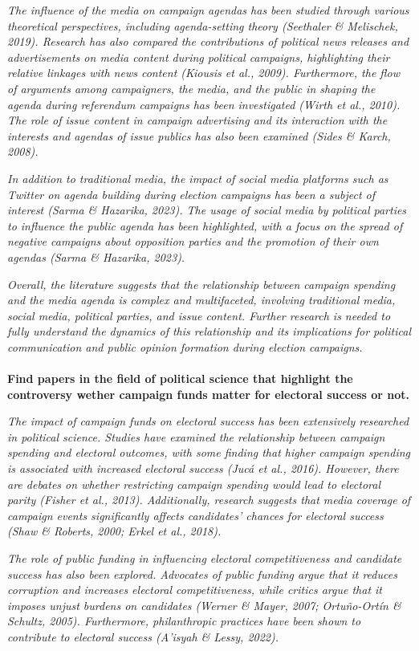 \documentclass[11pt,a4paper]{article}
\begin{document}
 \textit{The influence of the media on campaign agendas has been studied through various theoretical perspectives, including agenda-setting theory (Seethaler \& Melischek, 2019). Research has also compared the contributions of political news releases and advertisements on media content during political campaigns, highlighting their relative linkages with news content (Kiousis et al., 2009). Furthermore, the flow of arguments among campaigners, the media, and the public in shaping the agenda during referendum campaigns has been investigated (Wirth et al., 2010). The role of issue content in campaign advertising and its interaction with the interests and agendas of issue publics has also been examined (Sides \& Karch, 2008).}

 \textit{In addition to traditional media, the impact of social media platforms such as Twitter on agenda building during election campaigns has been a subject of interest (Sarma \& Hazarika, 2023). The usage of social media by political parties to influence the public agenda has been highlighted, with a focus on the spread of negative campaigns about opposition parties and the promotion of their own agendas (Sarma \& Hazarika, 2023).}

 \textit{Overall, the literature suggests that the relationship between campaign spending and the media agenda is complex and multifaceted, involving traditional media, social media, political parties, and issue content. Further research is needed to fully understand the dynamics of this relationship and its implications for political communication and public opinion formation during election campaigns.}
\\
\\
 \textbf{Find papers in the field of political science that highlight the controversy wether campaign funds matter for electoral success or not.}

\textit{The impact of campaign funds on electoral success has been extensively researched in political science. Studies have examined the relationship between campaign spending and electoral outcomes, with some finding that higher campaign spending is associated with increased electoral success (Jucá et al., 2016). However, there are debates on whether restricting campaign spending would lead to electoral parity (Fisher et al., 2013). Additionally, research suggests that media coverage of campaign events significantly affects candidates' chances for electoral success (Shaw \& Roberts, 2000; Erkel et al., 2018).}

 \textit{The role of public funding in influencing electoral competitiveness and candidate success has also been explored. Advocates of public funding argue that it reduces corruption and increases electoral competitiveness, while critics argue that it imposes unjust burdens on candidates (Werner \& Mayer, 2007; Ortuño-Ortín \& Schultz, 2005). Furthermore, philanthropic practices have been shown to contribute to electoral success (A'isyah \& Lessy, 2022).}
\end{document}
